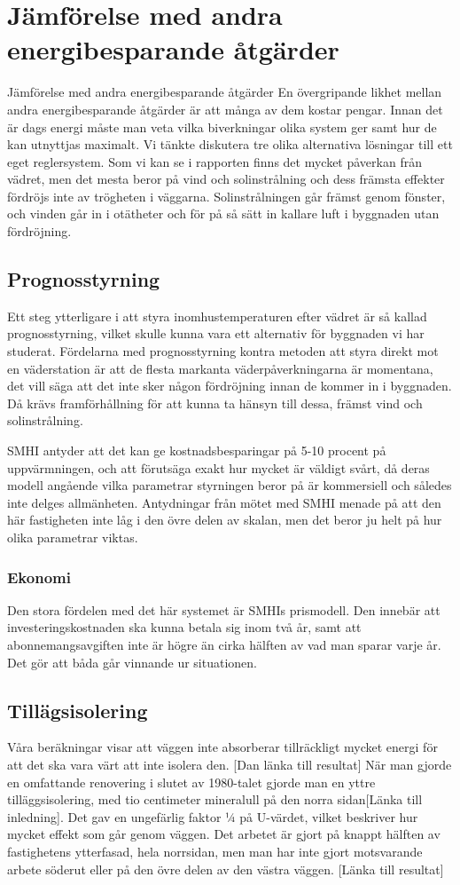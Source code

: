 \section{Jämförelse med andra energibesparande åtgärder}

Jämförelse med andra energibesparande åtgärder
En övergripande likhet mellan andra energibesparande åtgärder är att många av dem kostar pengar. Innan det är dags energi måste man veta vilka biverkningar olika system ger samt hur de kan utnyttjas maximalt.
Vi tänkte diskutera tre olika alternativa lösningar till ett eget reglersystem. 
Som vi kan se i rapporten finns det mycket påverkan från vädret, men det mesta beror på vind och solinstrålning och dess främsta effekter fördröjs inte av trögheten i väggarna. Solinstrålningen går främst genom fönster, och vinden går in i otätheter och för på så sätt in kallare luft i byggnaden utan fördröjning.
\subsection{Prognosstyrning}
Ett steg ytterligare i att styra inomhustemperaturen efter vädret är så kallad prognosstyrning, vilket skulle kunna vara ett alternativ för byggnaden vi har studerat.
Fördelarna med prognosstyrning kontra metoden att styra direkt mot en väderstation är att de flesta markanta väderpåverkningarna är momentana, det vill säga att det inte sker någon fördröjning innan de kommer in i byggnaden. Då krävs framförhållning för att kunna ta hänsyn till dessa, främst vind och solinstrålning.

SMHI antyder att det kan ge kostnadsbesparingar på 5-10 procent på uppvärmningen, och att förutsäga exakt hur mycket är väldigt svårt, då deras modell angående vilka parametrar styrningen beror på är kommersiell och således inte delges allmänheten.  Antydningar från mötet med SMHI menade på att den här fastigheten inte låg i den övre delen av skalan, men det beror ju helt på hur olika parametrar viktas.

\subsubsection{Ekonomi}
Den stora fördelen med det här systemet är SMHIs prismodell. Den innebär att investeringskostnaden ska kunna betala sig inom två år, samt att abonnemangsavgiften inte är högre än cirka hälften av vad man sparar varje år. Det gör att båda går vinnande ur situationen.
\subsection{Tillägsisolering}
Våra beräkningar visar att väggen inte absorberar tillräckligt mycket energi för att det ska vara värt att inte isolera den.  [Dan länka till resultat]
När man gjorde en omfattande renovering i slutet av 1980-talet gjorde man en yttre tilläggsisolering, med tio centimeter mineralull på den norra sidan[Länka till inledning]. Det gav en ungefärlig faktor ¼ på U-värdet, vilket beskriver hur mycket effekt som går genom väggen. Det arbetet är gjort på knappt hälften av fastighetens ytterfasad, hela norrsidan, men man har inte gjort motsvarande arbete söderut eller på den övre delen av den västra väggen. [Länka till resultat]

